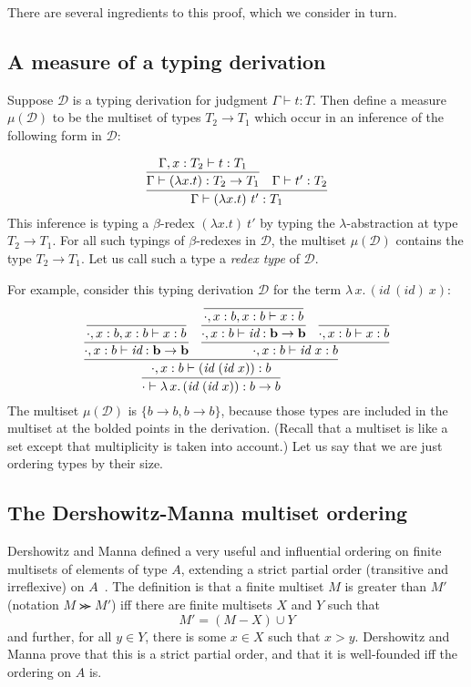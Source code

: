 \documentclass{article}
\begin{document}
There are several ingredients to this proof, which we consider in turn.

\subsection{A measure of a typing derivation}

Suppose $\mathcal{D}$ is a typing derivation for judgment $\Gamma\vdash t : T$.  Then
define a measure $\mu(\mathcal{D})$ to be the multiset of types $T_2 \to T_1$ which occur in an
inference of the following form in $\mathcal{D}$:

\[
\infer{\Gamma \vdash (\lambda x.t)\ t' : T_1}
       {\infer{\Gamma \vdash (\lambda x.t) : T_2\to T_1}
              {\Gamma, x : T_2 \vdash t : T_1} & \Gamma \vdash t' : T_2}
\]
\noindent This inference is typing a $\beta$-redex $(\lambda x.t)\ t'$ by
typing the $\lambda$-abstraction at type $T_2\to T_1$.  For all such
typings of $\beta$-redexes in $\mathcal{D}$, the multiset $\mu(\mathcal{D})$
contains the type $T_2 \to T_1$.  Let us call such a type a \emph{redex type}
of $\mathcal{D}$.

For example, consider this typing derivation $\mathcal{D}$ for the term $\lambda\,x.\,(\textit{id}\ (\textit{id})\ x)$:
\[
\infer{\cdot\vdash \lambda\,x.\,(\textit{id}\ (\textit{id}\ x)) : b \to b}
      {\infer{\cdot, x : b \vdash (\textit{id}\ (\textit{id}\ x)) : b}
        {\infer{\cdot, x : b \vdash \textit{id} : \mathbf{b \to b}}{\infer{\cdot, x : b , x : b \vdash x : b}{\ }} &
          \infer{\cdot , x : b \vdash \textit{id}\ x : b}
                {\infer{\cdot, x : b \vdash \textit{id} : \mathbf{b \to b}}{\infer{\cdot, x : b , x : b \vdash x : b}{\ }} &
                  \infer{\cdot, x : b \vdash x : b}{\ }}}}
\]
\noindent The multiset $\mu(\mathcal{D})$ is $\{ b \to b, b \to b \}$,
because those types are included in the multiset at the bolded points
in the derivation.  (Recall that a multiset is like a set except that multiplicity
is taken into account.)  Let us say that we are just ordering types by their
size.

\subsection{The Dershowitz-Manna multiset ordering}

Dershowitz and Manna defined a very useful and influential ordering on finite multisets of elements of type $A$, extending
a strict partial order (transitive and irreflexive) on $A$~\citep{dm79}.  The definition is that a finite multiset $M$ is
greater than $M'$ (notation $M \ggcurly M'$) iff there are finite multisets $X$ and $Y$ such that
\[
M' = (M - X) \cup Y
\]
\noindent and further, for all $y\in Y$, there is some $x \in X$ such that $x > y$.  Dershowitz and Manna prove that this
is a strict partial order, and that it is well-founded iff the ordering on $A$ is.
\end{document}
